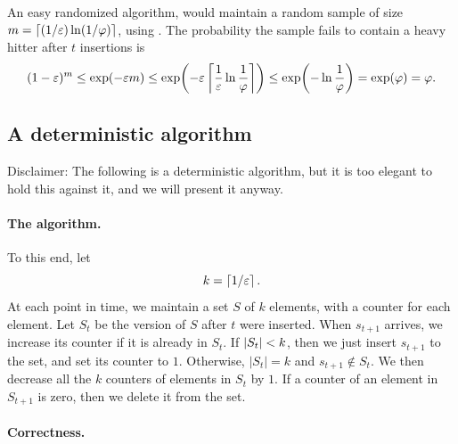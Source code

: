 An easy randomized algorithm, would maintain a random sample of size
$m = \left\lceil {(1/{\varepsilon}) \ln( 1/\varphi)} \right\rceil$, using . The probability the sample fails to
contain a heavy hitter after $t$ insertions is
\begin{equation*}
    (1-\eps)^m
    \leq
    \exp(-\eps m )%
    \leq%
    \exp\pth{-\eps \ceil{\frac{1}{\eps} \ln \frac{1}{\BadProb}} }%
    \leq 
    \exp\pth{- \ln \frac{1}{\BadProb}}%
    = 
    \exp\pth{ \BadProb }%
    =
    \BadProb.
\end{equation*}




\subsection{A deterministic algorithm}
Disclaimer: The following is a deterministic algorithm, but it is too
elegant to hold this against it, and we will present it anyway.


\paragraph*{The algorithm.}
To this end, let
\begin{equation*}
    k = \left\lceil {1/{\varepsilon}} \right\rceil. 
\end{equation*}
At each point in time, we maintain a set $S$ of $k$ elements, with a
counter for each element. Let $S_t$ be the version of $S$ after $t$
were inserted. When $s_{t+1}$ arrives, we increase its counter if it
is already in $S_t$. If $\left| {S_t} \right| < k$, then we just insert
$s_{t+1}$ to the set, and set its counter to $1$. Otherwise, $|S_t|=k$
and $s_{t+1} \notin S_t$. We then decrease all the $k$ counters of
elements in $S_t$ by $1$. If a counter of an element in $S_{t+1}$ is
zero, then we delete it from the set.



\paragraph*{Correctness.}

